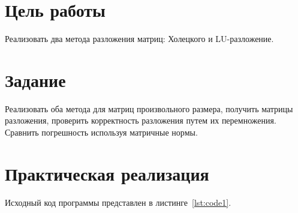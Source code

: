 \documentclass[a4paper, 14pt]{extarticle}
\begin{document}
\renewcommand{\ttdefault}{pcr}

\setlength{\tabcolsep}{3pt}
\newpage
\setcounter{page}{2}

\section{Цель работы}\label{Sect::goal}

Реализовать два метода разложения матриц: Холецкого и LU-разложение.

\section{Задание}\label{Sect::task}

Реализовать оба метода для матриц произвольного размера, получить матрицы разложения, проверить корректность разложения путем их перемножения. Сравнить погрешность используя матричные нормы.

\section{Практическая реализация}\label{Sect::code}

Исходный код программы представлен в листинге~\ref{lst:code1}.
\end{document}
